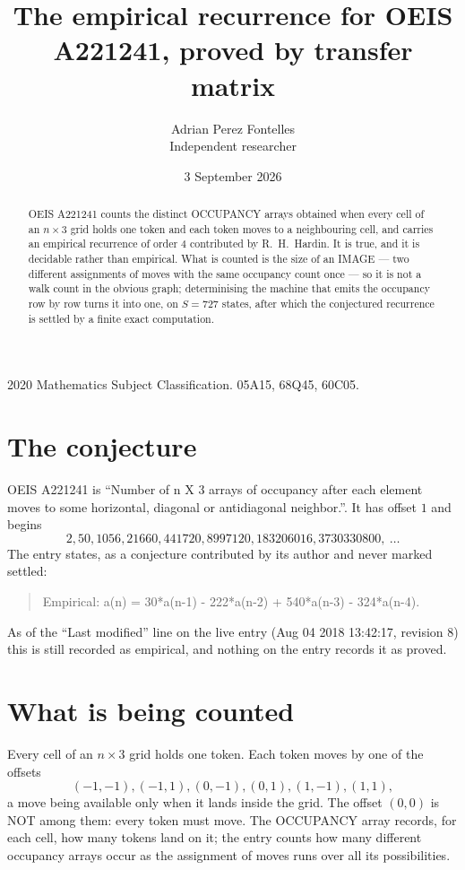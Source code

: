 \documentclass[11pt,a4paper]{article}
\title{The empirical recurrence for OEIS A221241, proved by transfer matrix}
\author{Adrian Perez Fontelles\\ \small Independent researcher}
\date{3 September 2026}
\theoremstyle{plain}
\theoremstyle{definition}
\begin{document}
\maketitle

\begin{abstract}
OEIS A221241 counts the distinct OCCUPANCY arrays obtained when every cell of an $n\times3$ grid
holds one token and each token moves to a neighbouring cell, and carries an empirical
recurrence of order $4$ contributed by R.~H.~Hardin. It is true, and it is decidable
rather than empirical. What is counted is the size of an IMAGE --- two different assignments of
moves with the same occupancy count once --- so it is not a walk count in the obvious graph;
determinising the machine that emits the occupancy row by row turns it into one, on $S=727$
states, after which the conjectured recurrence is settled by a finite exact computation.
\end{abstract}

\noindent\small 2020 Mathematics Subject Classification. 05A15, 68Q45, 60C05.\normalsize

\section{The conjecture}

OEIS A221241 is ``Number of n X 3 arrays of occupancy after each element moves to some horizontal, diagonal or antidiagonal neighbor.''. It has offset $1$ and begins
\[
2, 50, 1056, 21660, 441720, 8997120, 183206016, 3730330800,\ \dots
\]
The entry states, as a conjecture contributed by its author and never marked settled:
\begin{quote}
Empirical: a(n) = 30*a(n-1) - 222*a(n-2) + 540*a(n-3) - 324*a(n-4).
\end{quote}
As of the ``Last modified'' line on the live entry (Aug 04 2018 13:42:17, revision 8) this is still
recorded as empirical, and nothing on the entry records it as proved.

\section{What is being counted}

Every cell of an $n\times3$ grid holds one token. Each token moves by one of the offsets
\[
(-1,-1), (-1,1), (0,-1), (0,1), (1,-1), (1,1),
\]
a move being available only when it lands inside the grid. The offset $(0,0)$ is NOT among them: every token must move. The OCCUPANCY array
records, for each cell, how many tokens land on it; the entry counts how many different
occupancy arrays occur as the assignment of moves runs over all its possibilities.
\end{document}
